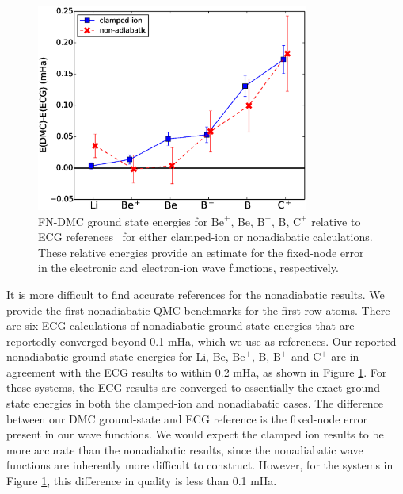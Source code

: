 \begin{figure}[h]
\centering
\includegraphics[width=0.8\textwidth]{atom-ECG}
\caption{FN-DMC ground state energies for $\text{Be}^+$, Be, $\text{B}^+$, B, $\text{C}^+$ relative to ECG references~\cite{Stanke_Be,Puchalski_Be+,Bubin_BeH_noBO,Bubin_B,Bubin_B+,Bubin_C+} for either clamped-ion or nonadiabatic calculations. These relative energies provide an estimate for the fixed-node error in the electronic and electron-ion wave functions, respectively.\label{fig:atom-ECG}}
\end{figure}

It is more difficult to find accurate references for the nonadiabatic results. We provide the first nonadiabatic QMC benchmarks for the first-row atoms. There are six ECG calculations of nonadiabatic ground-state energies that are reportedly converged beyond 0.1 mHa, which we use as references. Our reported nonadiabatic ground-state energies for Li, Be, $\text{Be}^+$, B, $\text{B}^+$ and $\text{C}^+$ are in agreement with the ECG results to within 0.2 mHa, as shown in Figure \ref{fig:atom-ECG}. For these systems, the ECG results are converged to essentially the exact ground-state energies in both the clamped-ion and nonadiabatic cases. The difference between our DMC ground-state and ECG reference is the fixed-node error present in our wave functions. We would expect the clamped ion results to be more accurate than the nonadiabatic results, since the nonadiabatic wave functions are inherently more difficult to construct.  However, for the systems in Figure \ref{fig:atom-ECG}, this difference in quality is less than 0.1 mHa.

